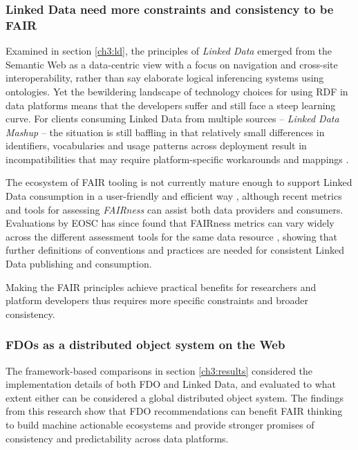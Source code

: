 \subsubsection{Linked Data need more constraints and consistency to be FAIR}
\label{ch61:constraints}

Examined in section \vref{ch3:ld}, the principles of \emph{Linked Data} emerged from the Semantic Web as a data-centric view with a focus on navigation and cross-site interoperability, rather than say elaborate logical inferencing systems using ontologies.  
Yet the bewildering landscape of technology choices for using RDF in data platforms means that the developers suffer and still face a steep learning curve. 
For clients consuming \acrlong{Linked Data} from multiple sources -- \emph{Linked Data Mashup} \cite{Tran 2014} -- the situation is still baffling in that relatively small differences in identifiers, vocabularies and usage patterns across deployment result in incompatibilities that may require platform-specific workarounds and mappings \cite{Millard 2010}. 

The ecosystem of FAIR tooling is not currently mature enough to support Linked Data consumption in a user-friendly and efficient way \cite{Thompson 2020}, although recent metrics and tools for assessing \emph{FAIRness} \cite{Wilkinson 2018} can assist both data providers and consumers. 
Evaluations by EOSC has since found that FAIRness metrics can vary widely across the different assessment tools for the same data resource \cite{Wilkinson 2022a}, showing that further definitions of conventions and practices are needed for consistent Linked Data publishing and consumption. 

Making the FAIR principles achieve practical benefits for researchers and platform developers thus requires more specific constraints and broader consistency.

\subsubsection{FDOs as a distributed object system on the Web}
\label{ch61:distributed}

The framework-based comparisons in section \vref{ch3:results} considered the implementation details of both \acrshort{FDO} and Linked Data, and evaluated to what extent either can be considered a global distributed object system. 
The findings from this research show that FDO recommendations can benefit FAIR thinking to build machine actionable ecosystems and provide stronger promises of consistency and predictability across data platforms. 

